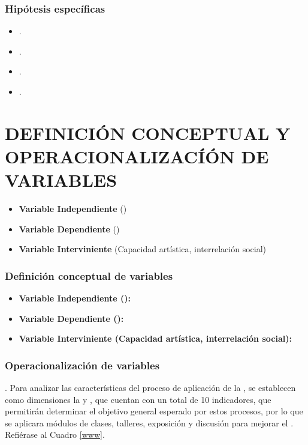 \documentclass[12pt,a4paper]{article}
\begin{document}
\subsubsection{Hipótesis específicas}
\begin{itemize}
	\item \hipotesise.
	\item \hipotesisee.
	\item \hipotesiseee.
	\item \hipotesiseeee.
\end{itemize}

\section{DEFINICIÓN CONCEPTUAL Y OPERACIONALIZACÍÓN DE VARIABLES }
\begin{itemize}
	\item \textbf{Variable Independiente} (\variablei)
	\item \textbf{Variable Dependiente} (\variabled)
	\item \textbf{Variable Interviniente} (Capacidad artística, interrelación social)
\end{itemize}

\subsubsection{Definición conceptual de variables}


\begin{itemize}
	\item \textbf{Variable Independiente (\variablei):}

	\item \textbf{Variable Dependiente (\variabled):}

	\item  \textbf{Variable Interviniente (Capacidad artística, interrelación social):}


\end{itemize}

\subsubsection{Operacionalización de variables}
\textbf{\variablei}. Para analizar las características del proceso de aplicación de la \MakeTextLowercase{\variablei}, se establecen como dimensiones la \emph{\MakeTextLowercase{\dimi}} y \emph{\MakeTextLowercase{\dimii}}, que cuentan con un total de 10 indicadores, que permitirán determinar el objetivo general esperado por estos procesos, por lo que se aplicara módulos de clases, talleres, exposición y discusión para mejorar el \MakeTextLowercase{\variabled}. Refiérase al Cuadro \ref{www}.
\end{document}
